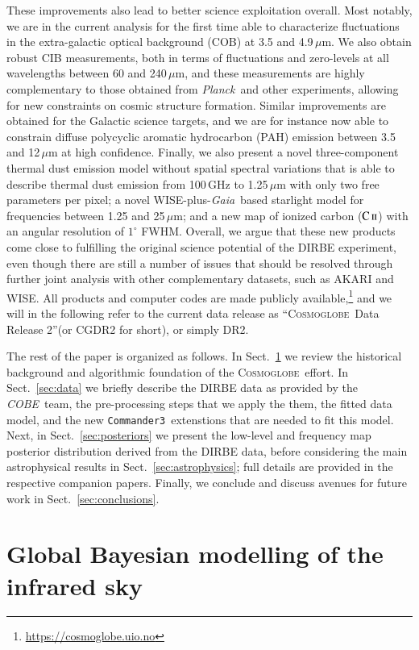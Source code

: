 \documentclass{aa}
\def\Cosmoglobe{\textsc{Cosmoglobe}}
\def\commanderthree{\texttt{Commander3}}
\def\Planck{\textit{Planck}}
\def\COBE{\textit{COBE}}
\def\GAIA{\textit{Gaia}}
\newcommand{\CII}{\ensuremath{\textsc{C\,ii}}}
\begin{document}
These improvements also lead to better science exploitation overall. Most notably, we are in the current analysis for the first time able to characterize fluctuations in the extra-galactic optical background (COB) at 3.5 and 4.9$\,\mu$m. We also obtain robust CIB measurements, both in terms of fluctuations and zero-levels at all wavelengths between 60 and 240$\,\mu$m, and these measurements are highly complementary to those obtained from \Planck\ and other experiments, allowing for new constraints on cosmic structure formation. Similar improvements are obtained for the Galactic science targets, and we are for instance now able to constrain diffuse polycyclic aromatic hydrocarbon (PAH) emission between 3.5 and 12$\,\mu$m at high confidence. Finally, we also present a novel three-component thermal dust emission model without spatial spectral variations that is able to describe thermal dust emission from 100\,GHz to 1.25$\,\mu$m with only two free parameters per pixel; a novel WISE-plus-\GAIA\ based starlight model for frequencies between 1.25 and 25$\,\mu$m; and a new map of ionized carbon (\CII) with an angular resolution of $1^{\circ}$ FWHM. Overall, we argue that these new products come close to fulfilling the original science potential of the DIRBE experiment, even though there are still a number of issues that should be resolved through further joint analysis with other complementary datasets, such as AKARI and WISE. All products and computer codes are made publicly available,\footnote{\url{https://cosmoglobe.uio.no}} and we will in the following refer to the current data release as ``\Cosmoglobe\ Data Release 2''(or CGDR2 for short), or simply DR2.

The rest of the paper is organized as follows. In Sect.~\ref{sec:global_modelling} we review the historical background and algorithmic foundation of the \Cosmoglobe\ effort. In Sect.~\ref{sec:data} we briefly describe the DIRBE data as provided by the \COBE\ team, the pre-processing steps that we apply the them, the fitted data model, and the new \commanderthree\ extenstions that are needed to fit this model. Next, in Sect.~\ref{sec:posteriors} we present the low-level and frequency map posterior distribution derived from the DIRBE data,  before considering the main astrophysical results in Sect.~\ref{sec:astrophysics}; full details are provided in the respective companion papers. Finally, we conclude and discuss avenues for future work in Sect.~\ref{sec:conclusions}.


\section{Global Bayesian modelling of the infrared sky}
\label{sec:global_modelling}
\end{document}
